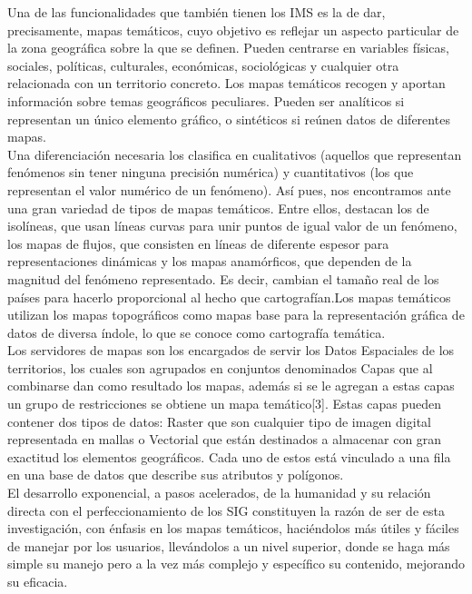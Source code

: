 Una de las funcionalidades que tambi\'en tienen los IMS es la de dar, precisamente, mapas tem\'aticos, cuyo objetivo es reflejar un aspecto particular de la zona geogr\'afica sobre la que se definen. Pueden centrarse en variables f\'isicas, sociales, pol\'iticas, culturales, econ\'omicas, sociol\'ogicas y cualquier otra relacionada con un territorio concreto. Los mapas tem\'aticos recogen y aportan informaci\'on sobre temas geogr\'aficos peculiares. Pueden ser anal\'iticos si representan un \'unico elemento gr\'afico, o sint\'eticos si re\'unen datos de diferentes mapas.\\

Una diferenciaci\'on necesaria los clasifica en cualitativos (aquellos que representan fen\'omenos sin tener ninguna precisi\'on num\'erica) y cuantitativos (los que representan el valor num\'erico de un fen\'omeno). As\'i pues, nos encontramos ante una gran
variedad de tipos de mapas tem\'aticos. Entre ellos, destacan los de isol\'ineas, que usan l\'ineas curvas para unir puntos de igual valor de un fen\'omeno, los mapas de flujos, que consisten en l\'ineas de diferente espesor para representaciones din\'amicas y los mapas anam\'orficos, que dependen de la magnitud del fen\'omeno representado. Es decir, cambian el tama\~no real de los pa\'ises para hacerlo proporcional al hecho que cartograf\'ian.Los mapas tem\'aticos utilizan los mapas topogr\'aficos como mapas base para la representaci\'on gr\'afica de datos de diversa \'indole, lo que se conoce como cartograf\'ia tem\'atica.\\ 

Los servidores de mapas son los encargados de servir los Datos Espaciales de los territorios, los cuales son agrupados en conjuntos denominados Capas que al combinarse dan como resultado los mapas, adem\'as si se le agregan a estas capas un grupo de restricciones se obtiene un mapa tem\'atico[3]. Estas capas pueden contener
dos tipos de datos: Raster que son cualquier tipo de imagen digital representada en mallas o Vectorial que est\'an destinados a almacenar con gran exactitud los elementos geogr\'aficos. Cada uno de estos est\'a vinculado a una fila en una base de datos que
describe sus atributos y pol\'igonos.\\

El desarrollo exponencial, a pasos acelerados, de la humanidad y su relaci\'on directa con el perfeccionamiento de los SIG constituyen la raz\'on de ser de esta investigaci\'on, con \'enfasis en los mapas tem\'aticos, haci\'endolos m\'as \'utiles y f\'aciles de manejar por los usuarios, llev\'andolos a un nivel superior, donde se haga m\'as simple su manejo pero a la vez m\'as complejo y espec\'ifico su contenido, mejorando su eficacia.



